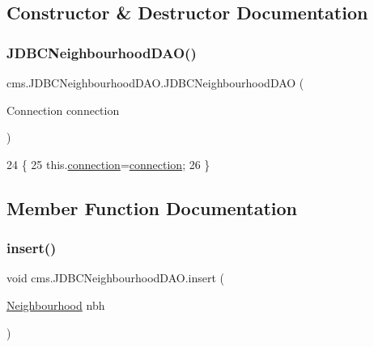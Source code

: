 \subsection{Constructor \& Destructor Documentation}
\mbox{\label{classcms_1_1_j_d_b_c_neighbourhood_d_a_o_a837dc9a2c409a5ae347271788c1d7d82}} 
\subsubsection{\texorpdfstring{J\+D\+B\+C\+Neighbourhood\+D\+A\+O()}{JDBCNeighbourhoodDAO()}}
{\footnotesize\ttfamily cms.\+J\+D\+B\+C\+Neighbourhood\+D\+A\+O.\+J\+D\+B\+C\+Neighbourhood\+D\+AO (\begin{DoxyParamCaption}\item[{Connection}]{connection }\end{DoxyParamCaption})\hspace{0.3cm}{\ttfamily [inline]}}


\begin{DoxyCode}
24                                                       \{
25          this.\mbox{\hyperlink{classcms_1_1_j_d_b_c_neighbourhood_d_a_o_a21abebcd3f93f10746a2c96c70d6dafc}{connection}}=\mbox{\hyperlink{classcms_1_1_j_d_b_c_neighbourhood_d_a_o_a21abebcd3f93f10746a2c96c70d6dafc}{connection}};
26     \}
\end{DoxyCode}


\subsection{Member Function Documentation}
\mbox{\label{classcms_1_1_j_d_b_c_neighbourhood_d_a_o_a5d43b764d1f27721d860dc371ae4b08e}} 
\subsubsection{\texorpdfstring{insert()}{insert()}}
{\footnotesize\ttfamily void cms.\+J\+D\+B\+C\+Neighbourhood\+D\+A\+O.\+insert (\begin{DoxyParamCaption}\item[{\mbox{\hyperlink{classcms_1_1_neighbourhood}{Neighbourhood}}}]{nbh }\end{DoxyParamCaption})\hspace{0.3cm}{\ttfamily [inline]}}



